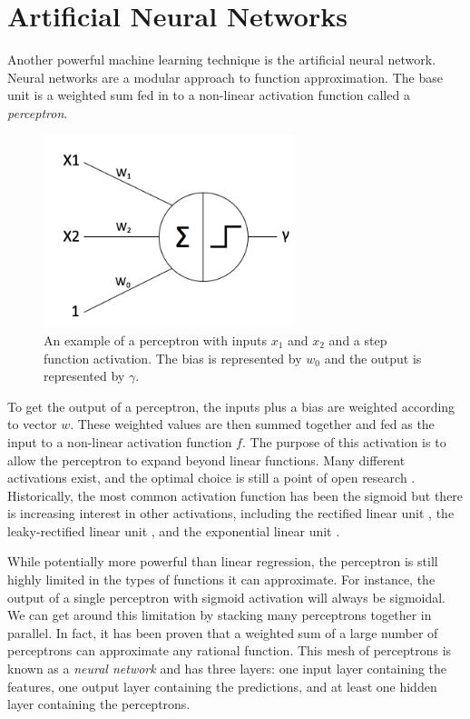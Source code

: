 \section{Artificial Neural Networks}

Another powerful machine learning technique is the artificial neural network. Neural networks are a modular approach to function approximation. The base unit is a weighted sum fed in to a non-linear activation function called a \textit{perceptron}.

\begin{figure}
\caption{An example of a perceptron with inputs $x_1$ and $x_2$ and a step function activation. The bias is represented by $w_0$ and the output is represented by $\gamma$.}
\includegraphics[width=0.65\textwidth]{fig/perceptron}
\centering
\end{figure}

To get the output of a perceptron, the inputs plus a bias are weighted according to vector $w$. These weighted values are then summed together and fed as the input to a non-linear activation function $f$. The purpose of this activation is to allow the perceptron to expand beyond linear functions. Many different activations exist, and the optimal choice is still a point of open research \citep{Duch2000TaxonomyFunctions} \citep{Xu2015EmpiricalNetwork}. Historically, the most common activation function has been the sigmoid \citep{Minsky1969PerceptronsGeometry} but there is increasing interest in other activations, including the rectified linear unit \citep{Glorot2011DeepNetworks}, the leaky-rectified linear unit \citep{Maas2013RectifierModels}, and the exponential linear unit \citep{Clevert2015FastELUs}. 

While potentially more powerful than linear regression, the perceptron is still highly limited in the types of functions it can approximate. For instance, the output of a single perceptron with sigmoid activation will always be sigmoidal. We can get around this limitation by stacking many perceptrons together in parallel. In fact, it has been proven \citep{Cybenko1989MathematicsFunction} that a weighted sum of a large number of perceptrons can approximate any rational function. This mesh of perceptrons is known as a \textit{neural network} and has three layers: one input layer containing the features, one output layer containing the predictions, and at least one hidden layer containing the perceptrons. 

